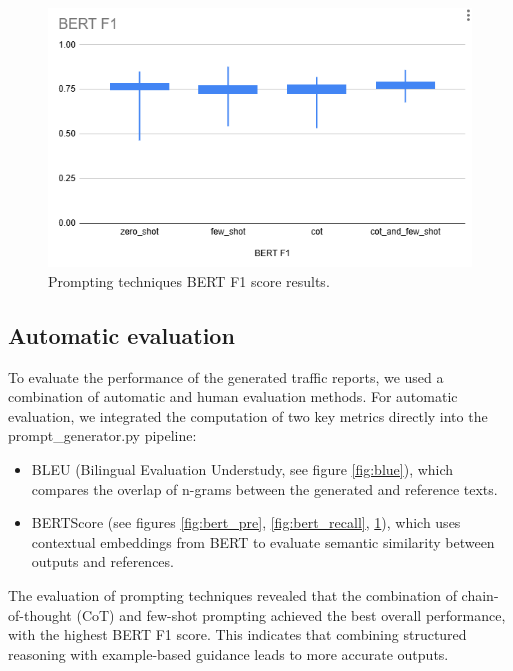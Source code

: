 \documentclass[fleqn,moreauthors,10pt]{ds_report}
\begin{document}
\newpage
\begin{figure}[h!]
  \centering
  \includegraphics[scale=0.4]{fig/bert_f1.png}
  \caption{Prompting techniques BERT F1 score results.}
  \label{fig:bert_f1}
\end{figure}

\subsection*{Automatic evaluation}

To evaluate the performance of the generated traffic reports, we used a combination of automatic and human evaluation methods. For automatic evaluation, we integrated the computation of two key metrics directly into the \newline prompt\_generator.py pipeline:

\begin{itemize}
    \item BLEU (Bilingual Evaluation Understudy, see figure \ref{fig:blue}), which compares the overlap of n-grams between the generated and reference texts.
    \item BERTScore (see figures \ref{fig:bert_pre}, \ref{fig:bert_recall}, \ref{fig:bert_f1}), which uses contextual embeddings from BERT to evaluate semantic similarity between outputs and references.
\end{itemize}

The evaluation of prompting techniques revealed that the combination of chain-of-thought (CoT) and few-shot prompting achieved the best overall performance, with the highest BERT F1 score. This indicates that combining structured reasoning with example-based guidance leads to more accurate outputs.\newline
\end{document}
